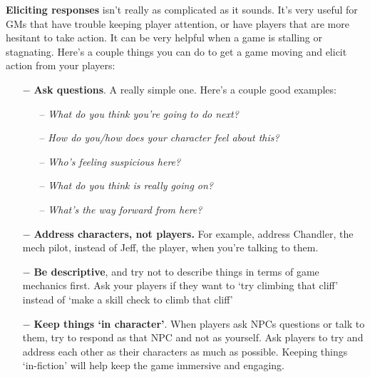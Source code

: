 \textbf{Eliciting responses} isn’t really as complicated as it sounds. It’s very useful for GMs that have
trouble keeping player attention, or have players that are more hesitant to take action. It can be
very helpful when a game is stalling or stagnating. Here’s a couple things you can do to get a
game moving and elicit action from your players:
\begin{itemize}
    \item[$-$]\textbf{Ask questions}. A really simple one. Here’s a couple good examples:
    \begin{itemize}
        \item[--]\textit{What do you think you’re going to do next?}
        \item[--]\textit{How do you/how does your character feel about this?}
        \item[--]\textit{Who’s feeling suspicious here?}
        \item[--]\textit{What do you think is really going on?}
        \item[--]\textit{What’s the way forward from here?}
    \end{itemize}
    \item[$-$]\textbf{Address characters, not players.} For example, address Chandler, the mech
            pilot, instead of Jeff, the player, when you’re talking to them.
    \item[$-$]\textbf{Be descriptive}, and try not to describe things in terms of game mechanics first.
        Ask your players if they want to ‘try climbing that cliff’ instead of ‘make a skill
        check to climb that cliff’
    \item[$-$]\textbf{ Keep things ‘in character’}. When players ask NPCs questions or talk to them, try
        to respond as that NPC and not as yourself. Ask players to try and address each
        other as their characters as much as possible. Keeping things ‘in-fiction’ will help
        keep the game immersive and engaging.
\end{itemize}
